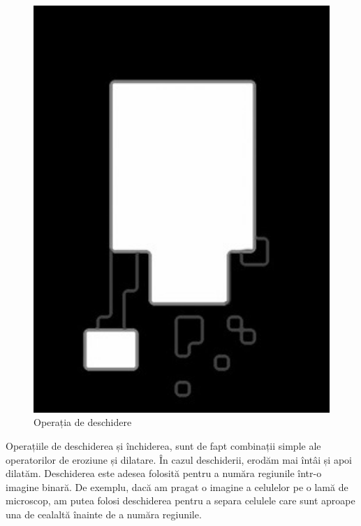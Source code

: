 \documentclass[a4paper,12pt]{report}
\begin{document}
\begin{figure}[h!]
\begin{minipage}{0.25\textwidth}
        \includegraphics[width=1\textwidth]{images/output_open.jpg}
        \caption{Operația de deschidere}
    \end{minipage}
\end{figure}
\FloatBarrier

Operațiile de deschiderea și închiderea, sunt de fapt combinații simple ale operatorilor de eroziune și dilatare. În cazul deschiderii, erodăm mai întâi și apoi dilatăm. Deschiderea este adesea folosită pentru a număra regiunile într-o imagine binară. De exemplu, dacă am pragat o imagine a celulelor pe o lamă de microscop, am putea folosi deschiderea pentru a separa celulele care sunt aproape una de cealaltă înainte de a număra regiunile.
\end{document}
